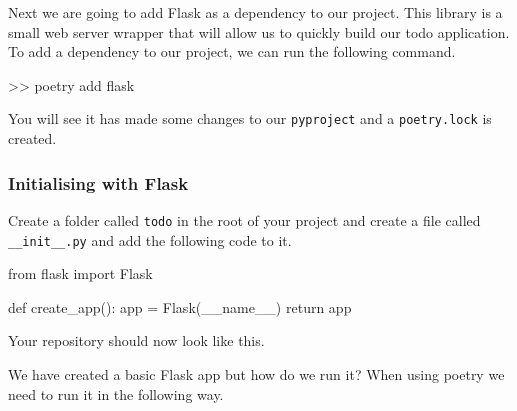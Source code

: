 \documentclass{csse4400}
\begin{document}


Next we are going to add Flask as a dependency to our project.
This library is a small web server wrapper that will allow us to quickly build our todo application.
To add a dependency to our project, we can run the following command.

\begin{code}[language=bash,numbers=none]{}
  >> poetry add flask
\end{code}

You will see it has made some changes to our \texttt{pyproject} and a \texttt{poetry.lock} is created.

\subsubsection{Initialising with Flask}

Create a folder called  \texttt{todo} in the root of your project and create a file called \texttt{\_\_init\_\_.py} and add the following code to it.

\begin{code}[language=python]{}
  from flask import Flask

  def create_app():
      app = Flask(__name__)
      return app
\end{code}

\begin{minipage}{\textwidth}
Your repository should now look like this.

\vspace{0.5em}
\end{minipage}

\vspace{0.75em}
We have created a basic Flask app but how do we run it?
When using poetry we need to run it in the following way.
\end{document}
